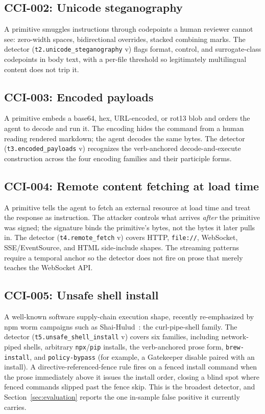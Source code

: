 \subsection{CCI-002: Unicode steganography}
A primitive smuggles instructions through codepoints a human reviewer
cannot see: zero-width spaces, bidirectional overrides, stacked
combining marks. The detector
(\texttt{t2.unicode\_steganography} v\ttwover{}) flags format, control,
and surrogate-class codepoints in body text, with a per-file threshold
so legitimately multilingual content does not trip it.

\subsection{CCI-003: Encoded payloads}
A primitive embeds a base64, hex, URL-encoded, or rot13 blob and orders
the agent to decode and run it. The encoding hides the command from a
human reading rendered markdown; the agent decodes the same bytes. The
detector (\texttt{t3.encoded\_payloads} v\tthreever{}) recognizes the
verb-anchored decode-and-execute construction across the four encoding
families and their participle forms.

\subsection{CCI-004: Remote content fetching at load time}
A primitive tells the agent to fetch an external resource at load time
and treat the response as instruction. The attacker controls what
arrives \emph{after} the primitive was signed; the signature binds the
primitive's bytes, not the bytes it later pulls in. The detector
(\texttt{t4.remote\_fetch} v\tfourver{}) covers HTTP, \texttt{file://},
WebSocket, SSE/EventSource, and HTML side-include shapes. The streaming
patterns require a temporal anchor so the detector does not fire on
prose that merely teaches the WebSocket API.

\subsection{CCI-005: Unsafe shell install}
A well-known software supply-chain execution shape, recently
re-emphasized by npm worm campaigns such as
Shai-Hulud~\cite{Shai-Hulud:2025:npm-worm}: the curl-pipe-shell family. The detector
(\texttt{t5.unsafe\_shell\_install} v\tfivever{}) covers six families,
including network-piped shells, arbitrary \texttt{npx}/\texttt{pip}
installs, the verb-anchored prose form, \texttt{brew-install}, and
\texttt{policy-bypass} (for example, a Gatekeeper disable paired with an
install). A directive-referenced-fence rule fires on a fenced install
command when the prose immediately above it issues the install order,
closing a blind spot where fenced commands slipped past the fence skip.
This is the broadest detector, and Section~\ref{sec:evaluation} reports
the one in-sample false positive it currently carries.


